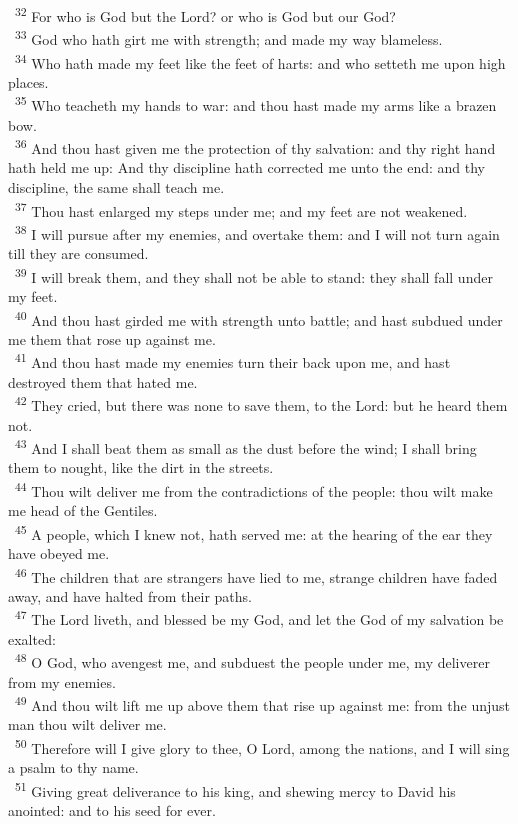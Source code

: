 \documentclass[a5paper,12pt]{article}
\begin{document}
\begin{multicols*}{2}
~\textsuperscript{32} For who is God but the Lord? or who is God but our God?\\
~\textsuperscript{33} God who hath girt me with strength; and made my way blameless.\\
~\textsuperscript{34} Who hath made my feet like the feet of harts: and who setteth me upon high places.\\
~\textsuperscript{35} Who teacheth my hands to war: and thou hast made my arms like a brazen bow.\\
~\textsuperscript{36} And thou hast given me the protection of thy salvation: and thy right hand hath held me up: And thy discipline hath corrected me unto the end: and thy discipline, the same shall teach me.\\
~\textsuperscript{37} Thou hast enlarged my steps under me; and my feet are not weakened.\\
~\textsuperscript{38} I will pursue after my enemies, and overtake them: and I will not turn again till they are consumed.\\
~\textsuperscript{39} I will break them, and they shall not be able to stand: they shall fall under my feet.\\
~\textsuperscript{40} And thou hast girded me with strength unto battle; and hast subdued under me them that rose up against me.\\
~\textsuperscript{41} And thou hast made my enemies turn their back upon me, and hast destroyed them that hated me.\\
~\textsuperscript{42} They cried, but there was none to save them, to the Lord: but he heard them not.\\
~\textsuperscript{43} And I shall beat them as small as the dust before the wind; I shall bring them to nought, like the dirt in the streets.\\
~\textsuperscript{44} Thou wilt deliver me from the contradictions of the people: thou wilt make me head of the Gentiles.\\
~\textsuperscript{45} A people, which I knew not, hath served me: at the hearing of the ear they have obeyed me.\\
~\textsuperscript{46} The children that are strangers have lied to me, strange children have faded away, and have halted from their paths.\\
~\textsuperscript{47} The Lord liveth, and blessed be my God, and let the God of my salvation be exalted:\\
~\textsuperscript{48} O God, who avengest me, and subduest the people under me, my deliverer from my enemies.\\
~\textsuperscript{49} And thou wilt lift me up above them that rise up against me: from the unjust man thou wilt deliver me.\\
~\textsuperscript{50} Therefore will I give glory to thee, O Lord, among the nations, and I will sing a psalm to thy name.\\
~\textsuperscript{51} Giving great deliverance to his king, and shewing mercy to David his anointed: and to his seed for ever.\\


\end{multicols*}
\end{document}
